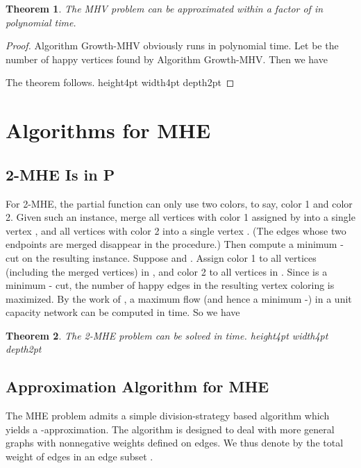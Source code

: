 \documentclass[11pt]{article}
\newtheorem{theorem}{Theorem}[section]
\newcommand{\qed}{\vrule height4pt width4pt depth2pt}
\begin{document}
\begin{theorem}
The MHV problem can be approximated within a factor of 
in polynomial time.
\end{theorem}
\begin{proof}
Algorithm {\sc Growth-MHV} obviously runs in polynomial time.
Let  be the number of happy vertices found by Algorithm {\sc Growth-MHV}.
Then we have

The theorem follows.
\qed
\end{proof}





\section{Algorithms for MHE}
\label{sec - algorithms for MHE}




\subsection{2-MHE Is in P}
For 2-MHE, the partial function  can only use two colors, to say,
color 1 and color 2. Given such an instance, merge all vertices with color 1
assigned by  into a single vertex , and all vertices with color 2
into a single vertex . (The edges whose two endpoints are merged disappear
in the procedure.) Then compute a minimum - cut  on
the resulting instance. Suppose  and . Assign color 1
to all vertices (including the merged vertices) in , and color 2 to
all vertices in . Since  is a minimum - cut,
the number of happy edges in the resulting vertex coloring is maximized.
By the work of \cite{ET75}, a maximum flow (and hence a minimum -)
in a unit capacity network can be computed in 
time. So we have

\begin{theorem}
\label{th - 2-MHE is in P}
The 2-MHE problem can be solved in  time.
\qed
\end{theorem}




\subsection{Approximation Algorithm for MHE}
The MHE problem admits a simple division-strategy based algorithm which
yields a -approximation. The algorithm is designed to
deal with more general graphs with nonnegative weights  defined
on edges. We thus denote by  the total weight of edges in an edge
subset .
\end{document}
